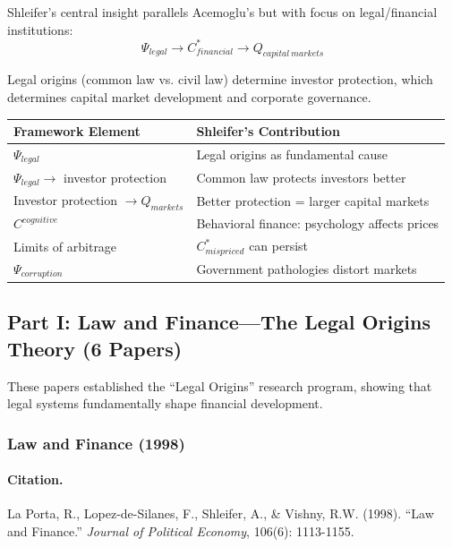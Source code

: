 \documentclass[12pt,a4paper]{article}
\begin{document}
Shleifer's central insight parallels Acemoglu's but with focus on legal/financial
institutions:
\begin{equation}
  \Psi_{legal} \to C^*_{financial} \to Q_{capital\ markets}
\end{equation}

Legal origins (common law vs. civil law) determine investor protection,
which determines capital market development and corporate governance.

\begin{center}
\renewcommand{\arraystretch}{1.2}
\small
\begin{tabular}{ll}
\hline
\textbf{Framework Element} & \textbf{Shleifer's Contribution} \\
\hline
$\Psi_{legal}$ & Legal origins as fundamental cause \\
$\Psi_{legal} \to$ investor protection & Common law protects investors better \\
Investor protection $\to Q_{markets}$ & Better protection = larger capital markets \\
$C^{cognitive}$ & Behavioral finance: psychology affects prices \\
Limits of arbitrage & $C^*_{mispriced}$ can persist \\
$\Psi_{corruption}$ & Government pathologies distort markets \\
\hline
\end{tabular}
\end{center}

\subsection{Part I: Law and Finance---The Legal Origins Theory (6 Papers)}

These papers established the ``Legal Origins'' research program, showing that
legal systems fundamentally shape financial development.

\subsubsection{Law and Finance (1998)}

\paragraph{Citation.}
La Porta, R., Lopez-de-Silanes, F., Shleifer, A., \& Vishny, R.W. (1998).
``Law and Finance.'' \emph{Journal of Political Economy}, 106(6): 1113-1155.
\end{document}
